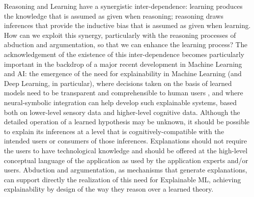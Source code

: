 \label{Section: Motivation and Background}
Reasoning and Learning have a synergistic inter-dependence: learning produces the knowledge that is assumed as given when reasoning; reasoning draws inferences that provide the inductive bias that is assumed as given when learning. How can we exploit this synergy, particularly with the reasoning processes of abduction and argumentation, so that we can enhance the learning process?
The acknowledgement of the existence of this inter-dependence becomes particularly important in the backdrop of a major recent development in Machine Learning and AI: the emergence of the need for explainability in Machine Learning (and Deep Learning, in particular), where decisions taken on the basis of learned models need to be transparent and comprehensible to human users , and where neural-symbolic integration can help develop such explainable systems, based both on lower-level sensory data and higher-level cognitive data. Although the detailed operation of a learned hypothesis may be unknown, it should be possible to explain its inferences at a level that is cognitively-compatible with the intended users or consumers of those inferences. Explanations should not require the users to have technological knowledge and should be offered at the high-level conceptual language of the application as used by the application experts and/or users. Abduction and argumentation, as mechanisms that generate explanations, can support directly the realization of this need for Explainable ML, achieving explainability by design of the way they reason over a learned theory.

